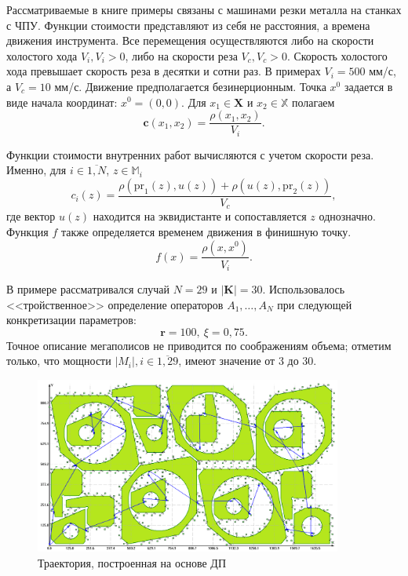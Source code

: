 \documentclass[11pt,twoside,openany]{report}
\begin{document}
{{Рассматриваемые в книге примеры связаны с машинами резки металла на станках с ЧПУ.
Функции стоимости представляют из себя не расстояния, а времена движения инструмента.
Все перемещения осуществляются либо на скорости холостого хода $V_i,V_i>0$,
либо на скорости реза
$V_c, V_c > 0$.
Скорость холостого хода превышает скорость
реза в десятки и сотни раз. В примерах $V_i=500$ мм/с, а $V_c=10$ мм/с.
Движение предполагается безинерционным.
Точка $x^0$ задается в виде начала координат: $x^0=(0,0)$.
Для $x_1\in \mathbf{X}$ и $x_2\in \mathbb{X}$ полагаем
\begin{equation}\label{ExtPrice}
\mathbf{c}(x_1,x_2)=\frac{\rho (x_1,x_2)}{V_i}.
\end{equation}

Функции стоимости внутренних работ вычисляются с учетом скорости реза.
Именно, для $i\in \overline{1,N}$, $z\in \mathbb{M}_i$
$$
c_i(z)=\frac{\rho(\mbox{pr}_1(z),u(z))+\rho(u(z),\mbox{pr}_2(z))}{V_c},
$$
где вектор $u(z)$ находится на эквидистанте и сопоставляется $z$ однозначно.
Функция $f$ также определяется временем движения в финишную точку.
\begin{equation}\label{TerminalPrice}
f(x)=\frac{\rho (x,x^0)}{V_i}.
\end{equation}

В примере рассматривался случай $N=29$ и $|\mathbf{K}| =30$. Использовалось
<<тройственное>> определение операторов $A_1,\ldots,A_N$ при следующей
конкретизации параметров:
$$
\mathbf{r}=100,\ \xi=0,75.
$$
Точное описание мегаполисов не приводится по соображениям объема; отметим
только, что мощности $|M_i|, i\in \overline{1,29}$, имеют значение от 3 до 30.

\begin{figure}
  \begin{center}
  \includegraphics[width=0.9\textwidth]{route_29_DP_AD.png}
  \caption{Траектория, построенная на основе ДП}
  \label{DP_Result}
  \end{center}
\end{figure}

}}
\end{document}
